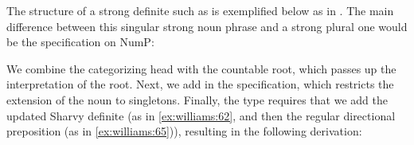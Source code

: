 \documentclass[output=paper,
modfonts
]{langscibook}
\begin{document}
The structure of a strong definite such as   is exemplified below as in . The main difference between this singular strong noun phrase and a strong plural one would be the specification on NumP:

\begin{exe}
\end{exe}
We combine the categorizing head with the countable root, which passes up the interpretation of the root. Next, we add in the  specification, which restricts the extension of the noun to singletons. Finally, the type requires that we add the updated Sharvy definite (as in \ref{ex:williams:62}, and then the regular directional preposition (as in \ref{ex:williams:65})), resulting in the following derivation:
\end{document}
